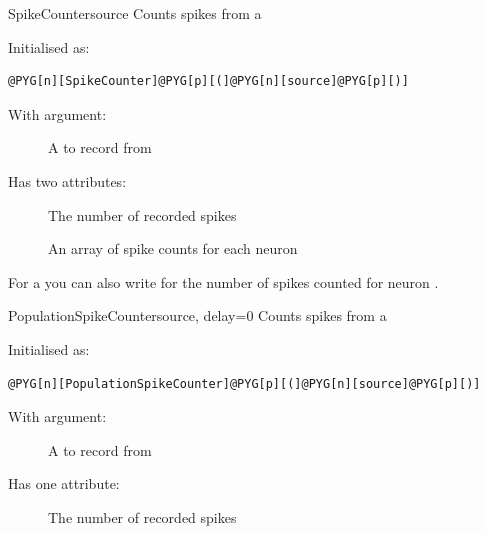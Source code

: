 \documentclass[letterpaper,10pt,english]{manual}
\begin{document}
\hypertarget{brian.SpikeCounter}{}\begin{classdesc}{SpikeCounter}{source}
Counts spikes from a \hyperlink{brian.NeuronGroup}{}

Initialised as:

\begin{Verbatim}[commandchars=@\[\]]
@PYG[n][SpikeCounter]@PYG[p][(]@PYG[n][source]@PYG[p][)]
\end{Verbatim}

With argument:
\begin{description}
\item[] \leavevmode
A \hyperlink{brian.NeuronGroup}{} to record from

\end{description}

Has two attributes:
\begin{description}
\item[] \leavevmode
The number of recorded spikes

\item[] \leavevmode
An array of spike counts for each neuron

\end{description}

For a \hyperlink{brian.SpikeCounter}{}  you can also write  for the
number of spikes counted for neuron .
\end{classdesc}

\hypertarget{brian.PopulationSpikeCounter}{}\begin{classdesc}{PopulationSpikeCounter}{source, delay=0}
Counts spikes from a \hyperlink{brian.NeuronGroup}{}

Initialised as:

\begin{Verbatim}[commandchars=@\[\]]
@PYG[n][PopulationSpikeCounter]@PYG[p][(]@PYG[n][source]@PYG[p][)]
\end{Verbatim}

With argument:
\begin{description}
\item[] \leavevmode
A \hyperlink{brian.NeuronGroup}{} to record from

\end{description}

Has one attribute:
\begin{description}
\item[] \leavevmode
The number of recorded spikes

\end{description}
\end{classdesc}
\end{document}
